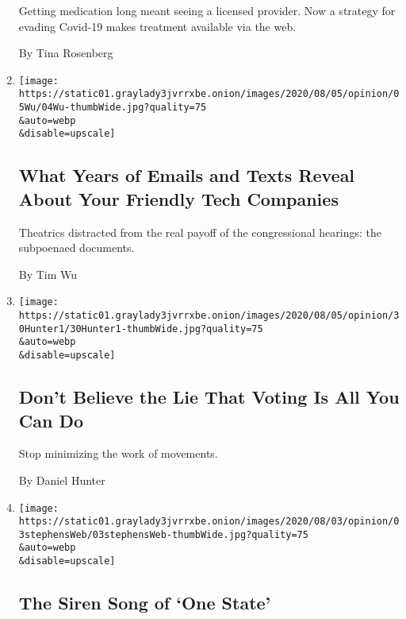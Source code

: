 \begin{enumerate}
  Getting medication long meant seeing a licensed provider. Now a
  strategy for evading Covid-19 makes treatment available via the web.

  By Tina Rosenberg
\item
  \href{/2020/08/04/opinion/amazon-facebook-congressional-hearings.html}{}

  \texttt{[image: https://static01.graylady3jvrrxbe.onion/images/2020/08/05/opinion/05Wu/04Wu-thumbWide.jpg?quality=75\\\&auto=webp\\\&disable=upscale]}

  \hypertarget{what-years-of-emails-and-texts-reveal-about-your-friendly-tech-companies}{%
  \subsection{What Years of Emails and Texts Reveal About Your Friendly
  Tech
  Companies}\label{what-years-of-emails-and-texts-reveal-about-your-friendly-tech-companies}}

  Theatrics distracted from the real payoff of the congressional
  hearings: the subpoenaed documents.

  By Tim Wu
\item
  \href{/2020/08/04/opinion/voting-2020-election-blm-movement.html}{}

  \texttt{[image: https://static01.graylady3jvrrxbe.onion/images/2020/08/05/opinion/30Hunter1/30Hunter1-thumbWide.jpg?quality=75\\\&auto=webp\\\&disable=upscale]}

  \hypertarget{dont-believe-the-lie-that-voting-is-all-you-can-do}{%
  \subsection{Don't Believe the Lie That Voting Is All You Can
  Do}\label{dont-believe-the-lie-that-voting-is-all-you-can-do}}

  Stop minimizing the work of movements.

  By Daniel Hunter
\item
  \href{/2020/08/03/opinion/israel-palestine-one-state-solution.html}{}

  \texttt{[image: https://static01.graylady3jvrrxbe.onion/images/2020/08/03/opinion/03stephensWeb/03stephensWeb-thumbWide.jpg?quality=75\\\&auto=webp\\\&disable=upscale]}

  \hypertarget{the-siren-song-of-one-state}{%
  \subsection{The Siren Song of `One
  State'}\label{the-siren-song-of-one-state}}


\end{enumerate}
